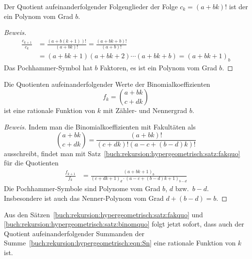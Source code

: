 \begin{satz}
%
\label{buch:rekursion:hypergeometrisch:satz:fakquo}
Der Quotient aufeinanderfolgender Folgenglieder
der Folge $c_k=(a+bk)!$ ist der ein Polynom vom Grad $b$.
\end{satz}
\begin{proof}[Beweis]
\begin{align*}
\frac{c_{k+1}}{c_k}
&=
\frac{(a+b(k+1))!}{(a+bk)!}
=
\frac{(a+bk+b)!}{(a+b)!}
\\
&=
(a+bk+1)(a+bk+2)\cdots(a+bk+b)
=
(a+bk+1)_b
\end{align*}
Das Pochhammer-Symbol hat $b$ Faktoren, es ist ein Polynom vom Grad $b$.
\end{proof}

\begin{satz}
%
\label{buch:rekursion:hypergeometrisch:satz:binomquo}
Die Quotienten aufeinanderfolgender Werte der Binomialkoeffizienten
\[
f_k
=
\binom{a+bk}{c+dk}
\]
ist eine rationale Funktion von $k$ mit Zähler- und Nennergrad $b$.
\end{satz}

\begin{proof}[Beweis]
Indem man die Binomialkoeffizienten mit Fakultäten als
\[
\binom{a+bk}{c+dk}
=
\frac{(a+bk)!}{(c+dk)!(a-c+(b-d)k)!}
\]
ausschreibt, findet man mit
Satz~\ref{buch:rekursion:hypergeometrisch:satz:fakquo}
für die Quotienten
\begin{align}
\frac{f_{k+1}}{f_k}
&=
\frac{(a+bk+1)_b}{(c+dk+1)_d\cdot(a-c+(b-d)k+1)_{b-d}}
\label{buch:rekursion:eqn:binomquotient}
\end{align}
Die Pochhammer-Symbole sind Polynome vom Grad $b$, $d$ bzw.~$b-d$.
Insbesondere ist auch das Nenner-Polynom vom Grad $d+(b-d)=b$.
\end{proof}

Aus den Sätzen~\ref{buch:rekursion:hypergeometrisch:satz:fakquo}
und
\ref{buch:rekursion:hypergeometrisch:satz:binomquo}
folgt jetzt sofort, dass auch der Quotient aufeinanderfolgender
Summanden der Summe~\eqref{buch:rekursion:hypergeometrisch:eqn:Sn}
eine rationale Funktion von $k$ ist.

%
%
